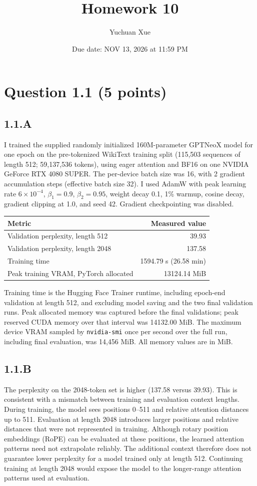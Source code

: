 \documentclass{article}
\title{Homework 10}
\author{Yuchuan Xue}
\date{Due date: NOV 13, 2026 at 11:59 PM}
\begin{document}
\maketitle
\section*{Question 1.1 (5 points)}
\subsection*{1.1.A}
I trained the supplied randomly initialized 160M-parameter GPTNeoX model for one epoch on the pre-tokenized WikiText training split (115,503 sequences of length 512; 59,137,536 tokens), using eager attention and BF16 on one NVIDIA GeForce RTX 4080 SUPER. The per-device batch size was 16, with 2 gradient accumulation steps (effective batch size 32). I used AdamW with peak learning rate $6\times10^{-4}$, $\beta_1=0.9$, $\beta_2=0.95$, weight decay 0.1, 1\% warmup, cosine decay, gradient clipping at 1.0, and seed 42. Gradient checkpointing was disabled.

\begin{center}
\begin{tabular}{lr}
\toprule
Metric & Measured value \\
\midrule
Validation perplexity, length 512 & 39.93 \\
Validation perplexity, length 2048 & 137.58 \\
Training time & 1594.79 s (26.58 min) \\
Peak training VRAM, PyTorch allocated & 13124.14 MiB \\
\bottomrule
\end{tabular}
\end{center}

Training time is the Hugging Face Trainer runtime, including epoch-end validation at length 512, and excluding model saving and the two final validation runs. Peak allocated memory was captured before the final validations; peak reserved CUDA memory over that interval was 14132.00 MiB. The maximum device VRAM sampled by \texttt{nvidia-smi} once per second over the full run, including final evaluation, was 14,456 MiB. All memory values are in MiB.

\subsection*{1.1.B}
The perplexity on the 2048-token set is higher (137.58 versus 39.93). This is consistent with a mismatch between training and evaluation context lengths. During training, the model sees positions 0--511 and relative attention distances up to 511. Evaluation at length 2048 introduces larger positions and relative distances that were not represented in training. Although rotary position embeddings (RoPE) can be evaluated at these positions, the learned attention patterns need not extrapolate reliably. The additional context therefore does not guarantee lower perplexity for a model trained only at length 512. Continuing training at length 2048 would expose the model to the longer-range attention patterns used at evaluation.
\end{document}
